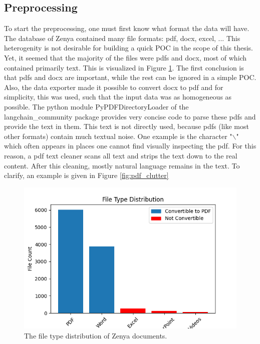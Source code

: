 \subsection{Preprocessing}
To start the preprocessing, one must first know what format the data will have. The database of Zenya contained many file formats: pdf, docx, excel, ... This heterogenity is not desirable for building a quick POC in the scope of this thesis. Yet, it seemed that the majority of the files were pdfs and docx, most of which contained primarily text. This is visualized in Figure \ref{fig:file_type_distribution}. The first conclusion is that pdfs and docx are important, while the rest can be ignored in a simple POC. Also, the data exporter made it possible to convert docx to pdf and for simplicity, this was used, such that the input data was as homogeneous as possible. The python module PyPDFDirectoryLoader of the langchain\_community package  provides very concise code to parse these pdfs and provide the text in them. This text is not directly used, because pdfs (like most other formats) contain much textual noise. One example is the character "$\backslash$" which often appears in places one cannot find visually inspecting the pdf. For this reason, a pdf text cleaner scans all text and strips the text down to the real content. After this cleaning, mostly natural language remains in the text. To clarify, an example is given in Figure \ref{fig:pdf_clutter}

\begin{figure}[H]
    \captionsetup{justification=centering}
    \centerline{\includegraphics[width=0.7\linewidth]{fig/file_type_distribution.png}}
    \caption{The file type distribution of Zenya documents.}
    \label{fig:file_type_distribution}
\end{figure}

